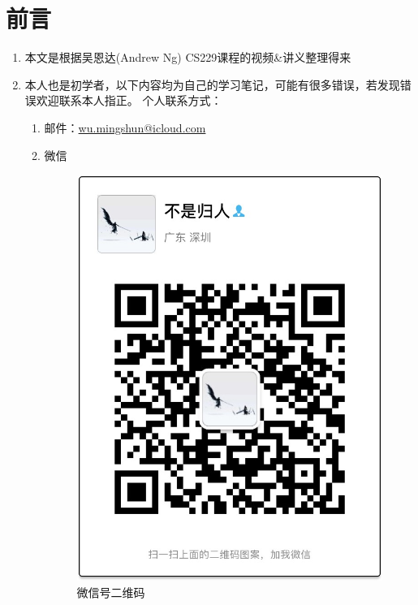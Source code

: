 \section{前言}
\begin{enumerate}
	\item 本文是根据吴恩达(Andrew Ng) CS229课程的视频\&讲义整理得来
	\item 本人也是初学者，以下内容均为自己的学习笔记，可能有很多错误，若发现错误欢迎联系本人指正。
	个人联系方式：
	\begin{enumerate}
		\item 邮件：\href{mailto:wu.mingshun@icloud.com}{wu.mingshun@icloud.com}
		\item 微信
		\begin{figure}[htbp]
			\centering
			\includegraphics[scale=0.25]{images/微信号二维码}
			\caption{微信号二维码}
		\end{figure}
	\end{enumerate}
	
\end{enumerate}



























